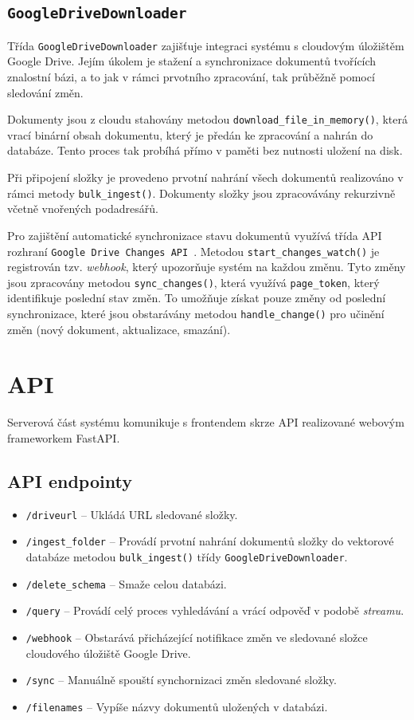 \subsection{\texttt{GoogleDriveDownloader}}

Třída \texttt{GoogleDriveDownloader} zajišťuje integraci systému s cloudovým úložištěm Google Drive. Jejím úkolem je stažení a synchronizace dokumentů tvořících znalostní bázi, a to jak v rámci prvotního zpracování, tak průběžně pomocí sledování změn.

Dokumenty jsou z cloudu stahovány metodou \texttt{download\_file\_in\_memory()}, která vrací binární obsah dokumentu, který je předán ke zpracování a nahrán do databáze. Tento proces tak probíhá přímo v paměti bez nutnosti uložení na disk. 

Při připojení složky je provedeno prvotní nahrání všech dokumentů realizováno v rámci metody \texttt{bulk\_ingest()}. Dokumenty složky jsou zpracovávány rekurzivně včetně vnořených podadresářů.

Pro zajištění automatické synchronizace stavu dokumentů využívá třída API rozhraní \texttt{Google Drive Changes API}~\cite{googledriveapi}. Metodou \texttt{start\_changes\_watch()} je registrován tzv. \textit{webhook}, který upozorňuje systém na každou změnu. Tyto změny jsou zpracovány metodou \texttt{sync\_changes()}, která využívá \texttt{page\_token}, který identifikuje poslední stav změn. To umožňuje získat pouze změny od poslední synchronizace, které jsou obstarávány metodou \texttt{handle\_change()} pro učinění změn (nový dokument, aktualizace, smazání).

\newpage

\section{API}
Serverová část systému komunikuje s frontendem skrze API realizované webovým frameworkem FastAPI. 

\subsection{API endpointy}
\begin{itemize}
    \item \texttt{/driveurl} – Ukládá URL sledované složky.
    \item \texttt{/ingest\_folder} – Provádí prvotní nahrání dokumentů složky do vektorové databáze metodou \texttt{bulk\_ingest()} třídy \texttt{GoogleDriveDownloader}.
    \item \texttt{/delete\_schema} – Smaže celou databázi.
    \item \texttt{/query} – Provádí celý proces vyhledávání a vrácí odpověď v podobě \textit{streamu}.
    \item \texttt{/webhook} – Obstarává přicházející notifikace změn ve sledované složce cloudového úložiště Google Drive.
    \item \texttt{/sync} – Manuálně spouští synchornizaci změn  sledované složky.
    \item \texttt{/filenames} – Vypíše názvy dokumentů uložených v databázi.
\end{itemize}

